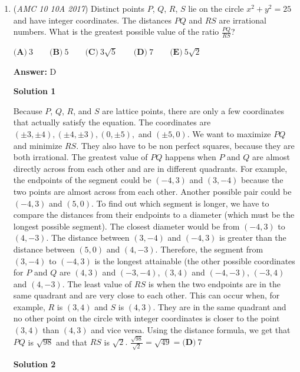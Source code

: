 \begin{enumerate}
By inspection, $(1, 2, 3, 4, 6)$ yields the lowest answer of $12$ and the sum of the digits is $1+2 \Longrightarrow \boxed{\textbf{(B)}\ 3}$



	\item (\textit{AMC 10 10A 2017}) Distinct points $P$, $Q$, $R$, $S$ lie on the circle $x^2+y^2=25$ and have integer coordinates. The distances $PQ$ and $RS$  are irrational numbers. What is the greatest possible value of the ratio $\frac{PQ}{RS}$?


 $\textbf{(A)}\ 3\qquad\textbf{(B)}\ 5\qquad\textbf{(C)}\ 3\sqrt{5}\qquad\textbf{(D)}\ 7\qquad\textbf{(E)}\ 5\sqrt{2}$

 \textbf{Answer: }D



\textbf{Solution 1}

Because $P$, $Q$, $R$, and $S$ are lattice points, there are only a few coordinates that actually satisfy the equation. The coordinates are $(\pm 3,\pm 4), (\pm 4, \pm 3), (0,\pm 5),$ and $(\pm 5,0).$ We want to maximize $PQ$ and minimize $RS.$ They also have to be non perfect squares, because they are both irrational. The greatest value of $PQ$ happens when $P$ and $Q$ are almost directly across from each other and are in different quadrants. For example, the endpoints of the segment could be $(-4,3)$ and $(3,-4)$ because the two points are almost across from each other. Another possible pair could be $(-4,3)$ and $(5,0)$. To find out which segment is longer, we have to compare the distances from their endpoints to a diameter (which must be the longest possible segment). The closest diameter would be from $(-4,3)$ to $(4,-3)$. The distance between $(3,-4)$ and $(-4,3)$ is greater than the distance between $(5,0)$ and $(4,-3)$. Therefore, the segment from $(3,-4)$ to $(-4,3)$ is the longest attainable (the other possible coordinates for $P$ and $Q$ are $(4,3)$ and $(-3, -4)$, $(3, 4)$ and $(-4, -3)$, $(-3, 4)$ and $(4, -3)$. The least value of $RS$ is when the two endpoints are in the same quadrant and are very close to each other. This can occur when, for example, $R$ is $(3,4)$ and $S$ is $(4,3).$ They are in the same quadrant and no other point on the circle with integer coordinates is closer to the point $(3,4)$ than $(4,3)$ and vice versa. Using the distance formula, we get that $PQ$ is $\sqrt{98}$ and that $RS$ is $\sqrt{2}.$ $\frac{\sqrt{98}}{\sqrt{2}}=\sqrt{49}=\boxed{\mathrm{\textbf{(D)}}\ 7}$




\textbf{Solution 2}


\end{enumerate}

